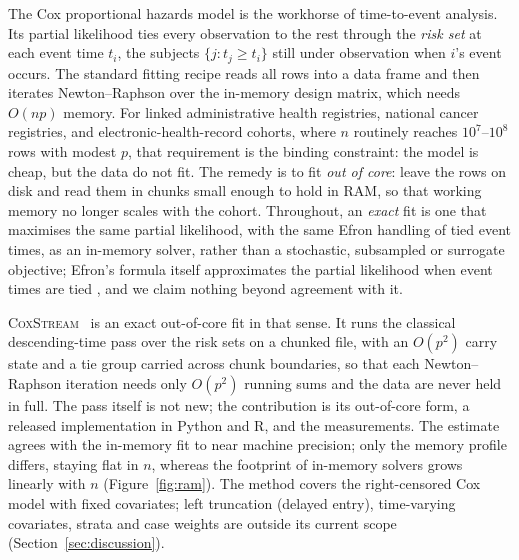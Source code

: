 \documentclass[11pt,a4paper]{article}
\newcommand{\coxstream}{\textsc{CoxStream}}
\begin{document}
The Cox proportional hazards model \citep{cox1972regression} is the workhorse of
time-to-event analysis. Its partial likelihood ties every observation to the
rest through the \emph{risk set} at each event time $t_i$, the subjects
$\{j : t_j \ge t_i\}$ still under observation when $i$'s event occurs. The
standard fitting recipe reads all rows into a data frame and then iterates
Newton--Raphson over the in-memory design matrix, which needs $O(np)$ memory.
For linked administrative health registries, national cancer registries, and
electronic-health-record cohorts, where $n$ routinely reaches $10^7$--$10^8$
rows with modest $p$, that requirement is the binding constraint: the model is cheap,
but the data do not fit. The remedy is to fit \emph{out of core}: leave the rows
on disk and read them in chunks small enough to hold in RAM, so that working
memory no longer scales with the cohort. Throughout, an \emph{exact} fit is one
that maximises the same partial likelihood, with the same Efron handling of
tied event times, as an in-memory solver, rather than a stochastic, subsampled
or surrogate objective; Efron's formula itself approximates the partial
likelihood when event times are tied \citep{efron1977efficiency}, and we claim
nothing beyond agreement with it.

\coxstream\ \citep{coxstream2026} is an exact out-of-core fit in that sense. It
runs the classical descending-time pass over the risk sets on a chunked file,
with an $O(p^2)$ carry state and a tie group carried across chunk boundaries,
so that each Newton--Raphson iteration needs only $O(p^2)$ running sums and the
data are never held in full. The pass itself is not new; the contribution is
its out-of-core form, a released implementation in Python and R, and the
measurements. The estimate agrees with the in-memory fit to near machine
precision; only the memory profile differs, staying flat in $n$,
whereas the footprint of in-memory solvers grows linearly with $n$
(Figure~\ref{fig:ram}). The method covers the right-censored Cox model with
fixed covariates; left truncation (delayed entry), time-varying covariates,
strata and case weights are outside its current scope
(Section~\ref{sec:discussion}).
\end{document}
